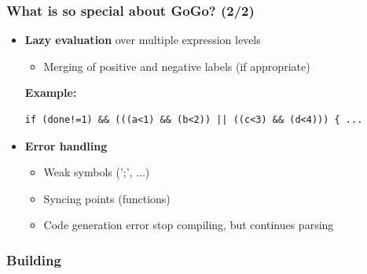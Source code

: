 \documentclass{beamer}
\begin{document}
\begin{frame}[containsverbatim]
    \frametitle{What is so special about GoGo? (2/2)}
    \begin{itemize}
        \item \textbf{Lazy evaluation} over multiple expression levels\\
            \begin{itemize}
                \item Merging of positive and negative labels (if appropriate)
            \end{itemize} 
            \tiny \textbf{Example:} \normalsize
            \begin{lstlisting}
if (done!=1) && (((a<1) && (b<2)) || ((c<3) && (d<4))) { ...
            \end{lstlisting}
        \item \textbf{Error handling}
            \begin{itemize}
                \item Weak symbols (';', ...)
                \item Syncing points (functions)
                \item Code generation error stop compiling, but continues parsing
            \end{itemize}
    \end{itemize}
\end{frame}

\begin{frame}
    \frametitle{Building}
\end{frame}

\end{document}
